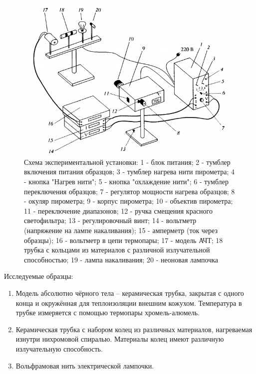 \documentclass[a4paper, 12pt]{article}%
\begin{document}
\begin{figure}[ht]
    \centering
    \includegraphics[width=11cm]{Схема.PNG}
    \caption{Схема экспериментальной установки: 1 - блок питания; 2 - тумблер включения питания образцов; 3 - тумблер нагрева нити пирометра; 4 - кнопка "Нагрев нити"; 5 - кнопка "охлаждение нити"; 6 - тумблер переключения образцов; 7 - регулятор мощности нагрева образцов; 8 - окуляр пирометра; 9 - корпус пирометра; 10 - объектив пирометра; 11 - переключение диапазонов; 12 - ручка смещения красного светофильтра; 13 - регулировочный винт; 14 - вольтметр (напряжение на лампе накаливания); 15 - амперметр (ток через образцы); 16 - вольтметр в цепи термопары; 17 - модель АЧТ; 18 трубка с кольцами из материалов с различной излучательной способностью; 19 - лампа накаливания; 20 - неоновая лампочка}
\end{figure}

\newpage

Исследуемые образцы:

\begin{enumerate}

    \item Модель абсолютно чёрного тела -- керамическая трубка,  закрытая с одного конца и окружённая для теплоизоляции внешним кожухом. Температура в трубке измеряется с помощью термопары хромель-алюмель.
    
    \item Керамическая трубка с набором колец из различных материалов, нагреваемая изнутри нихромовой спиралью.  Материалы колец имеют различную излучательную способность.
    
    \item Вольфрамовая нить электрической лампочки.
    
\end{enumerate}
\end{document}
